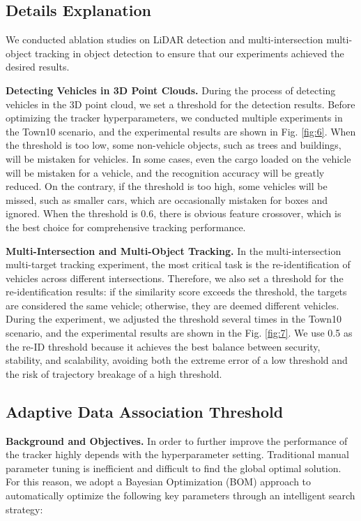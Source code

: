 \documentclass[lettersize,journal]{IEEEtran}
\begin{document}
\subsection{Details Explanation}

We conducted ablation studies on LiDAR detection and multi-intersection multi-object tracking in object detection to ensure that our experiments achieved the desired results.

\textbf{Detecting Vehicles in 3D Point Clouds.}
During the process of detecting vehicles in the 3D point cloud, we set a threshold for the detection results.
Before optimizing the tracker hyperparameters, we conducted multiple experiments in the Town10 scenario, and the experimental results are shown in Fig. \ref{fig:6}.
When the threshold is too low, some non-vehicle objects, such as trees and buildings, will be mistaken for vehicles. In some cases, even the cargo loaded on the vehicle will be mistaken for a vehicle, and the recognition accuracy will be greatly reduced.
On the contrary, if the threshold is too high, some vehicles will be missed, such as smaller cars, which are occasionally mistaken for boxes and ignored.
When the threshold is 0.6, there is obvious feature crossover, which is the best choice for comprehensive tracking performance.

\textbf{Multi-Intersection and Multi-Object Tracking.}
In the multi-intersection multi-target tracking experiment, the most critical task is the re-identification of vehicles across different intersections. 
Therefore, we also set a threshold for the re-identification results: if the similarity score exceeds the threshold, the targets are considered the same vehicle; otherwise, they are deemed different vehicles. 
During the experiment, we adjusted the threshold several times in the Town10 scenario, and the experimental results are shown in the Fig. \ref{fig:7}.
We use 0.5 as the re-ID threshold because it achieves the best balance between security, stability, and scalability, avoiding both the extreme error of a low threshold and the risk of trajectory breakage of a high threshold.

\subsection{Adaptive Data Association Threshold}

\textbf{Background and Objectives.}
In order to further improve the performance of the tracker highly depends with the hyperparameter setting. 
Traditional manual parameter tuning is inefficient and difficult to find the global optimal solution. 
For this reason, we adopt a Bayesian Optimization (BOM) approach to automatically optimize the following key parameters through an intelligent search strategy:
\end{document}
